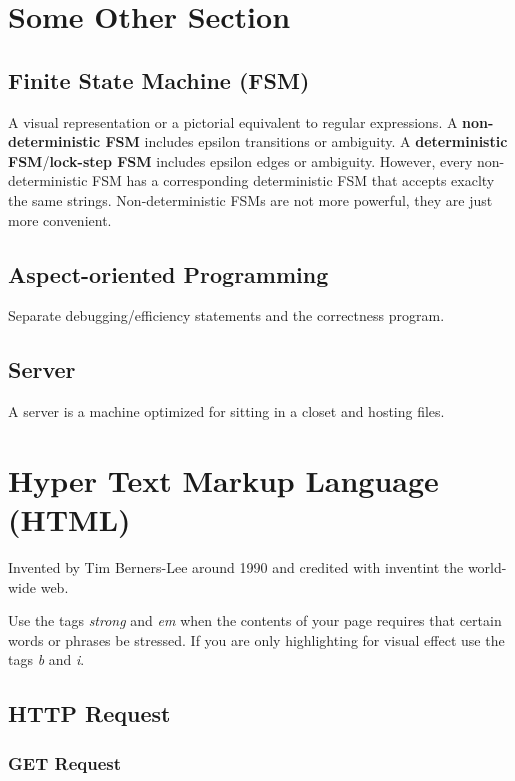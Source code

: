 \documentclass[12pt]{article}
\begin{document}
\section{Some Other Section}

\subsection*{Finite State Machine (FSM)}
A visual representation or a pictorial equivalent to regular expressions. A \textbf{non-deterministic FSM} includes epsilon transitions or ambiguity. 
A \textbf{deterministic FSM}/\textbf{lock-step FSM} includes  epsilon edges or ambiguity. However, every non-deterministic FSM has a corresponding deterministic FSM that accepts exaclty the same strings. Non-deterministic FSMs are not more powerful, they are just more convenient.

\subsection{Aspect-oriented Programming}
Separate debugging/efficiency statements and the correctness program.

\subsection*{Server}
A server is a machine optimized for sitting in a closet and hosting files.

\section{Hyper Text Markup Language (HTML)}

Invented by Tim Berners-Lee around 1990 and credited with inventint the world-wide web.

Use the tags \emph{strong} and \emph{em} when the contents of your page requires that certain words or phrases be stressed. If you are only highlighting for visual effect use the tags \emph{b} and \emph{i}.

\subsection{HTTP Request}

\subsubsection{GET Request}
\end{document}
